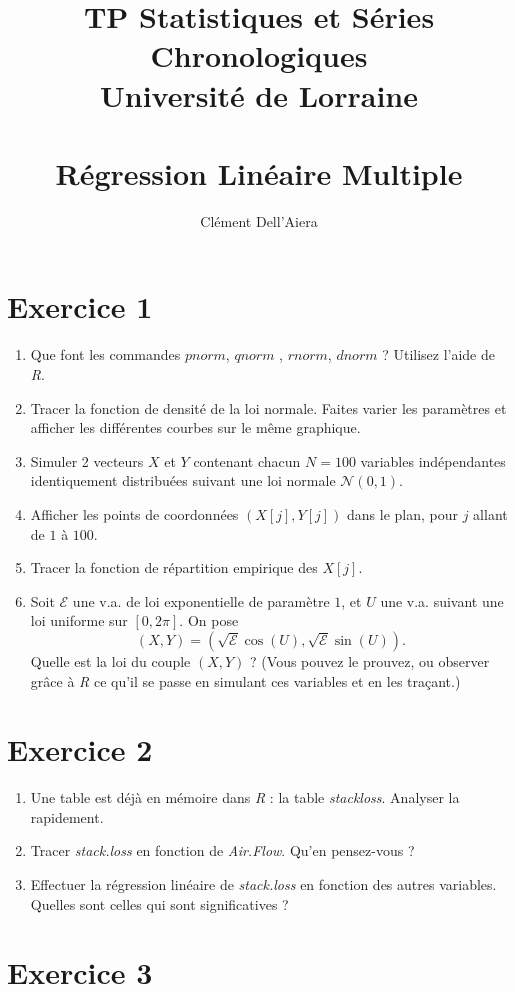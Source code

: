\documentclass[a4paper]{article}
\title{TP Statistiques et Séries Chronologiques  \\ Université de Lorraine \\ ~ \\
\textbf{Régression Linéaire Multiple}}
\date{} %
\author{ Clément Dell'Aiera }
\begin{document}
  
\maketitle

\section{Exercice 1}
\begin{enumerate}
\item Que font les commandes $pnorm$, $qnorm$ , $rnorm$, $dnorm$ ? Utilisez l'aide de \textit{R}.
\item Tracer la fonction de densité de la loi normale. Faites varier les paramètres et afficher les différentes courbes sur le même graphique. 
\item Simuler 2 vecteurs $X$ et $Y$ contenant chacun $N=100$ variables indépendantes identiquement distribuées suivant une loi normale $\mathcal N (0,1)$.
\item Afficher les points de coordonnées $(X[j],Y[j])$ dans le plan, pour $j$ allant de $1$ à $100$.
\item Tracer la fonction de répartition empirique des $X[j]$.
\item Soit $\mathcal E$ une v.a. de loi exponentielle de paramètre $1$, et $U$ une v.a. suivant une loi uniforme sur $[0,2\pi]$. On pose 
\[(X,Y)=(\sqrt{\mathcal E}\cos (U), \sqrt{\mathcal E} \sin (U)).\]
Quelle est la loi du couple $(X,Y)$ ? (Vous pouvez le prouvez, ou observer grâce à \textit{R} ce qu'il se passe en simulant ces variables et en les traçant.)
\end{enumerate}

\section{Exercice 2}

\begin{enumerate}
\item Une table est déjà en mémoire dans \textit{R} : la table \textit{stackloss}. Analyser la rapidement.
\item Tracer \textit{stack.loss} en fonction de \textit{Air.Flow}. Qu'en pensez-vous ?
\item Effectuer la régression linéaire de \textit{stack.loss} en fonction des autres variables. Quelles sont celles qui sont significatives ?
\end{enumerate}

\section{Exercice 3}
\end{document}
